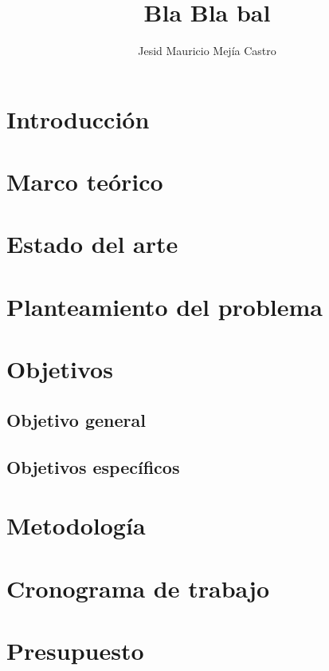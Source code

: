 \documentclass[11pt,letterpaper]{book}
\author{Jesid Mauricio Mejía Castro}
\title{Bla Bla bal}
\begin{document}
\maketitle
\chapter{Introducción}
\chapter{Marco teórico}
\chapter{Estado del arte}
\chapter{Planteamiento del problema}
\chapter{Objetivos}
	\section{Objetivo general}
	\section{Objetivos específicos}
\chapter{Metodología}
\chapter{Cronograma de trabajo}
\chapter{Presupuesto}
\end{document}
